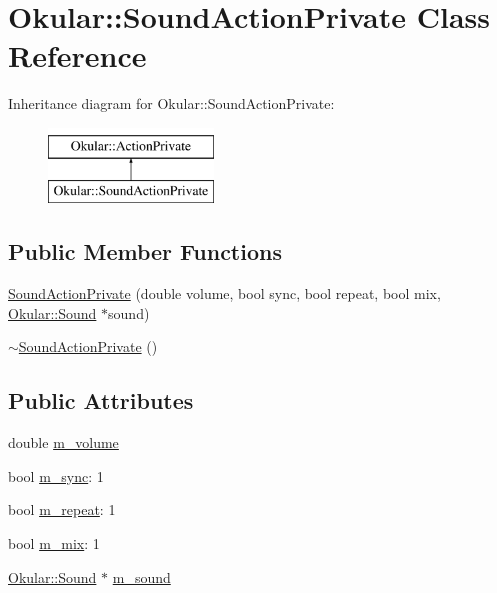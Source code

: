 \hypertarget{classOkular_1_1SoundActionPrivate}{\section{Okular\+:\+:Sound\+Action\+Private Class Reference}
\label{classOkular_1_1SoundActionPrivate}
}
Inheritance diagram for Okular\+:\+:Sound\+Action\+Private\+:\begin{figure}[H]
\begin{center}
\leavevmode
\includegraphics[height=2.000000cm]{classOkular_1_1SoundActionPrivate}
\end{center}
\end{figure}
\subsection*{Public Member Functions}
\begin{DoxyCompactItemize}
\item 
\hyperlink{classOkular_1_1SoundActionPrivate_ac2ae30e3b53f371d2baae532c6cd1ae9}{Sound\+Action\+Private} (double volume, bool sync, bool repeat, bool mix, \hyperlink{classOkular_1_1Sound}{Okular\+::\+Sound} $\ast$sound)
\item 
\hyperlink{classOkular_1_1SoundActionPrivate_a5a5b01eb99fc30bfa8fa1482c5e81104}{$\sim$\+Sound\+Action\+Private} ()
\end{DoxyCompactItemize}
\subsection*{Public Attributes}
\begin{DoxyCompactItemize}
\item 
double \hyperlink{classOkular_1_1SoundActionPrivate_a6414b8a4f1f8f3211445210c2ced6d7e}{m\+\_\+volume}
\item 
bool \hyperlink{classOkular_1_1SoundActionPrivate_ab25affe21a1da956293de62161eea3a5}{m\+\_\+sync}\+: 1
\item 
bool \hyperlink{classOkular_1_1SoundActionPrivate_a19b8db0cb7ad6c132b8287294de70b32}{m\+\_\+repeat}\+: 1
\item 
bool \hyperlink{classOkular_1_1SoundActionPrivate_ade73fa600054b322bbca409f58104ac9}{m\+\_\+mix}\+: 1
\item 
\hyperlink{classOkular_1_1Sound}{Okular\+::\+Sound} $\ast$ \hyperlink{classOkular_1_1SoundActionPrivate_a8e5f8737f78be5852224dafabd0ba1a1}{m\+\_\+sound}
\end{DoxyCompactItemize}


